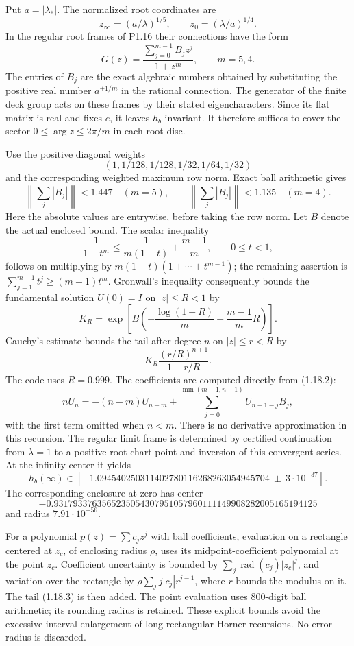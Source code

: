 \item Put $a=|\lambda_*|$.  The normalized root coordinates are
\[
 z_\infty=(a/\lambda)^{1/5},\qquad
 z_0=(\lambda/a)^{1/4}.
\]
In the regular root frames of P1.16 their connections have the form
\[
 G(z)=\frac{\sum_{j=0}^{m-1}B_jz^j}{1+z^m},\qquad m=5,4.
\tag{1.18.2}
\]
The entries of $B_j$ are the exact algebraic numbers obtained by
substituting the positive real number $a^{\pm1/m}$ in the rational
connection.  The generator of the finite deck group acts on these
frames by their stated eigencharacters.  Since its flat matrix is
real and fixes $e$, it leaves $h_b$ invariant.  It therefore suffices
to cover the sector $0\leq\arg z\leq2\pi/m$ in each root disc.


\item Use the positive diagonal weights
\[
 (1,1/128,1/128,1/32,1/64,1/32)
\]
and the corresponding weighted maximum row norm.  Exact ball
arithmetic gives
\[
 \left\|\sum_j |B_j|\right\|<1.447\quad(m=5),\qquad
 \left\|\sum_j |B_j|\right\|<1.135\quad(m=4).
\]
Here the absolute values are entrywise, before taking the row norm.
Let $B$ denote the actual enclosed bound.  The scalar inequality
\[
 \frac1{1-t^m}\leq\frac1{m(1-t)}+\frac{m-1}{m},\qquad0\leq t<1,
\]
follows on multiplying by $m(1-t)(1+\cdots+t^{m-1})$;
the remaining assertion is
$\sum_{j=1}^{m-1}t^j\geq(m-1)t^m$.
Gronwall's inequality consequently bounds the fundamental solution
$U(0)=I$ on $|z|\leq R<1$ by
\[
 K_R=\exp\!\left[B\left(-\frac{\log(1-R)}m
                    +\frac{m-1}{m}R\right)\right].
\]
Cauchy's estimate bounds the tail after degree $n$ on $|z|\leq r<R$
by
\[
 K_R\frac{(r/R)^{n+1}}{1-r/R}.
\tag{1.18.3}
\]
The code uses $R=0.999$.  The coefficients are computed directly
from (1.18.2):
\[
 nU_n=-(n-m)U_{n-m}
       +\sum_{j=0}^{\min(m-1,n-1)}U_{n-1-j}B_j,
\]
with the first term omitted when $n<m$.
There is no derivative approximation in this recursion.
The regular limit frame is determined by certified continuation
from $\lambda=1$ to a positive root-chart point and inversion of
this convergent series.  At the infinity center it yields
\[
 h_b(\infty)\in
 [-1.094540250311402780116268263054945704
       \ \mathbin{\pm}\ 3\cdot10^{-37}].
\tag{1.18.4}
\]
The corresponding enclosure at zero has center
\[
-0.9317933763565235054307951057960111149908282005165194125
\]
and radius $7.91\cdot10^{-56}$.


\item For a polynomial $p(z)=\sum c_jz^j$ with ball coefficients, evaluation
on a rectangle centered at $z_c$, of enclosing radius $\rho$, uses
its midpoint-coefficient polynomial at the point $z_c$.  Coefficient
uncertainty is bounded by
$\sum_j\operatorname{rad}(c_j)|z_c|^j$, and variation over the
rectangle by
$\rho\sum_j j|c_j|r^{j-1}$, where $r$ bounds the modulus on it.
The tail (1.18.3) is then added.  The point evaluation uses 800-digit
ball arithmetic; its rounding radius is retained.  These explicit
bounds avoid the excessive interval enlargement of long rectangular
Horner recursions.  No error radius is discarded.


